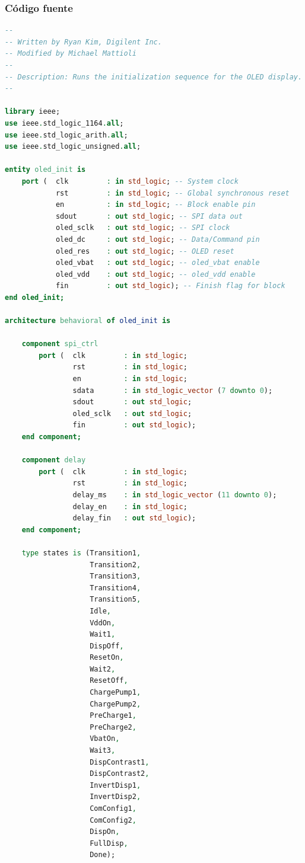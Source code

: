 \documentclass[a4paper,12pt]{article}
\begin{document}
\subsubsection*{Código fuente}
\begin{lstlisting}[language=VHDL,basicstyle=\ttfamily\small,frame=single,caption={oled\_init.vhd}]
--
-- Written by Ryan Kim, Digilent Inc.
-- Modified by Michael Mattioli
--
-- Description: Runs the initialization sequence for the OLED display.
--

library ieee;
use ieee.std_logic_1164.all;
use ieee.std_logic_arith.all;
use ieee.std_logic_unsigned.all;

entity oled_init is
    port (  clk         : in std_logic; -- System clock
            rst         : in std_logic; -- Global synchronous reset
            en          : in std_logic; -- Block enable pin
            sdout       : out std_logic; -- SPI data out
            oled_sclk   : out std_logic; -- SPI clock
            oled_dc     : out std_logic; -- Data/Command pin
            oled_res    : out std_logic; -- OLED reset
            oled_vbat   : out std_logic; -- oled_vbat enable
            oled_vdd    : out std_logic; -- oled_vdd enable
            fin         : out std_logic); -- Finish flag for block
end oled_init;

architecture behavioral of oled_init is

    component spi_ctrl
        port (  clk         : in std_logic;
                rst         : in std_logic;
                en          : in std_logic;
                sdata       : in std_logic_vector (7 downto 0);
                sdout       : out std_logic;
                oled_sclk   : out std_logic;
                fin         : out std_logic);
    end component;

    component delay
        port (  clk         : in std_logic;
                rst         : in std_logic;
                delay_ms    : in std_logic_vector (11 downto 0);
                delay_en    : in std_logic;
                delay_fin   : out std_logic);
    end component;

    type states is (Transition1,
                    Transition2,
                    Transition3,
                    Transition4,
                    Transition5,
                    Idle,
                    VddOn,
                    Wait1,
                    DispOff,
                    ResetOn,
                    Wait2,
                    ResetOff,
                    ChargePump1,
                    ChargePump2,
                    PreCharge1,
                    PreCharge2,
                    VbatOn,
                    Wait3,
                    DispContrast1,
                    DispContrast2,
                    InvertDisp1,
                    InvertDisp2,
                    ComConfig1,
                    ComConfig2,
                    DispOn,
                    FullDisp,
                    Done);


\end{lstlisting}
\end{document}
